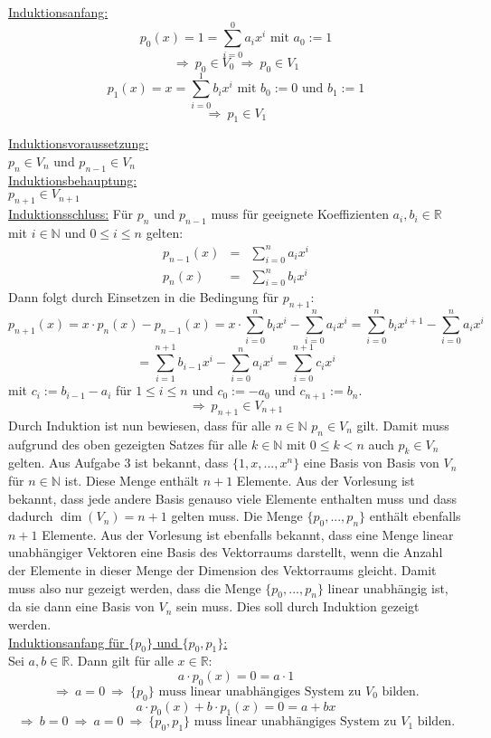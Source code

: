 \documentclass[10pt, a4paper]{article}
\begin{document}
		\underline{Induktionsanfang:}
		\[
			p_0(x) = 1 = \sum_{i=0}^0 a_ix^i \text{ mit } a_0 := 1
		\]
		\[
			\Rightarrow \ p_0 \in V_0 \ \Rightarrow \ p_0 \in V_1
		\]
		\[
			p_1(x) = x = \sum_{i=0}^1 b_ix^i \text{ mit } b_0 := 0 \text{ und } b_1 := 1
		\]
		\[
			\Rightarrow \ p_1 \in V_1
		\]

		\underline{Induktionsvoraussetzung:}\\
		$p_n \in V_n$ und $p_{n-1} \in V_n$ \\

		\underline{Induktionsbehauptung:}\\
		$p_{n+1} \in V_{n+1}$\\

		\underline{Induktionsschluss:}
		Für $p_n$ und $p_{n-1}$ muss für geeignete Koeffizienten $a_i,b_i \in \mathbb{R}$ mit $i \in \mathbb{N}$ und $0 \leq i \leq n$ gelten:
		\begin{eqnarray*}
			p_{n-1}(x) &=& \sum_{i=0}^n a_ix^i\\
			p_n(x) &=& \sum_{i=0}^n b_ix^i
		\end{eqnarray*}
		Dann folgt durch Einsetzen in die Bedingung für $p_{n+1}$:
		\[
			p_{n+1}(x) = x\cdot p_n(x) - p_{n-1}(x) = x\cdot \sum_{i=0}^n b_ix^i - \sum_{i=0}^n a_ix^i = \sum_{i=0}^n b_ix^{i+1} - \sum_{i=0}^n a_ix^i 
		\]
		\[
			= \sum_{i=1}^{n+1} b_{i-1}x^i - \sum_{i=0}^n a_ix^i = \sum_{i=0}^{n+1} c_ix^i
		\]
		mit $c_i := b_{i-1}-a_i$ für $1\leq i \leq n$ und $c_0 := -a_0$ und $c_{n+1} := b_{n}$.
		\[
			\Rightarrow \ p_{n+1} \in V_{n+1}
		\]
		Durch Induktion ist nun bewiesen, dass für alle $n \in \mathbb{N}$ $p_n \in V_n$ gilt. Damit muss aufgrund des oben gezeigten Satzes für alle $k \in \mathbb{N}$ mit $0\leq k < n$ auch $p_k \in V_n$ gelten.
		Aus Aufgabe 3 ist bekannt, dass $\{1,x,...,x^n\}$ eine Basis von Basis von $V_n$ für $n \in \mathbb{N}$ ist. Diese Menge enthält $n+1$ Elemente. Aus der Vorlesung ist bekannt, dass jede andere Basis genauso viele Elemente enthalten muss und dass dadurch $\dim(V_n) = n+1$ gelten muss. Die Menge $\{p_0,...,p_n\}$ enthält ebenfalls $n+1$ Elemente. Aus der Vorlesung ist ebenfalls bekannt, dass eine Menge linear unabhängiger Vektoren eine Basis des Vektorraums darstellt, wenn die Anzahl der Elemente in dieser Menge der Dimension des Vektorraums gleicht. Damit muss also nur gezeigt werden, dass die Menge $\{p_0,...,p_n\}$ linear unabhängig ist, da sie dann eine Basis von $V_n$ sein muss. Dies soll durch Induktion gezeigt werden. \\

		\underline{Induktionsanfang für $\{p_0\}$ und $\{p_0,p_1\}$:}\\
		Sei $a,b \in \mathbb{R}$. Dann gilt für alle $x \in \mathbb{R}$:
		\[
			a\cdot p_0(x) = 0 = a\cdot 1
		\]
		\[
			\Rightarrow \ a = 0 \ \Rightarrow \ \{p_0\} \text{ muss linear unabhängiges System zu } V_0 \text{ bilden.}
		\]
		\[
			a\cdot p_0(x) + b\cdot p_1(x) = 0 = a+bx
		\]
		\[
			\Rightarrow \ b = 0 \ \Rightarrow \ a = 0 \ \Rightarrow \ \{p_0, p_1\} \text{ muss linear unabhängiges System zu } V_1 \text{ bilden.}
		\]
\end{document}

